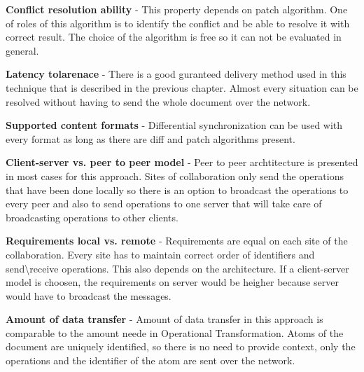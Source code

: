 \documentclass[12pt,oneside]{fithesis2}
\begin{document}
\vspace{3mm}

\textbf{Conflict resolution ability} - This property depends on patch algorithm. One of roles of this algorithm is to identify the conflict and be able to resolve it with correct result. The choice of the algorithm is free so it can not be evaluated in general.

\vspace{3mm}

\textbf{Latency tolarenace} - There is a good guranteed delivery method used in this technique that is described in the previous chapter. Almost every situation can be resolved without having to send the whole document over the network.

\vspace{3mm}

\textbf{Supported content formats} - Differential synchronization can be used with every format as long as there are diff and patch algorithms present.

\vspace{3mm} 

\par \textbf{\underline{}}

\vspace{3mm} 

\textbf{Client-server vs. peer to peer model} - Peer to peer archtitecture is presented in most cases for this approach. Sites of collaboration only send the operations that have been done locally so there is an option to broadcast the operations to every peer and also to send operations to one server that will take care of broadcasting operations to other clients.

\vspace{3mm} 

\textbf{Requirements local vs. remote} - Requirements are equal on each site of the collaboration. Every site has to maintain correct order of identifiers and send\textbackslash receive operations. This also depends on the architecture. If a client-server model is choosen, the requirements on server would be heigher because server would have to broadcast the messages.

\vspace{3mm} 

\textbf{Amount of data transfer} - Amount of data transfer in this approach is comparable to the amount neede in Operational Transformation. Atoms of the document are uniquely identified, so there is no need to provide context, only the operations and the identifier of the atom are sent over the network.
\end{document}
